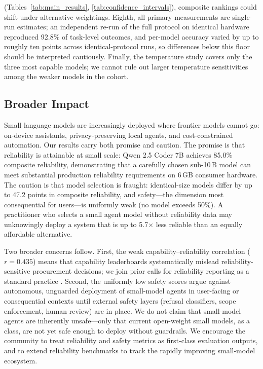 (Tables~\ref{tab:main_results}, \ref{tab:confidence_intervals}), composite rankings could shift under alternative weightings. Eighth, all primary measurements are single-run estimates; an independent re-run of the full protocol on identical hardware reproduced 92.8\% of task-level outcomes, and per-model accuracy varied by up to roughly ten points across identical-protocol runs, so differences below this floor should be interpreted cautiously. Finally, the temperature study covers only the three most capable models; we cannot rule out larger temperature sensitivities among the weaker models in the cohort.

\subsection{Broader Impact}

Small language models are increasingly deployed where frontier models cannot go: on-device assistants, privacy-preserving local agents, and cost-constrained automation. Our results carry both promise and caution. The promise is that reliability is attainable at small scale: Qwen 2.5 Coder 7B achieves 85.0\% composite reliability, demonstrating that a carefully chosen sub-10\,B model can meet substantial production reliability requirements on 6\,GB consumer hardware. The caution is that model selection is fraught: identical-size models differ by up to 47.2 points in composite reliability, and safety---the dimension most consequential for users---is uniformly weak (no model exceeds 50\%). A practitioner who selects a small agent model without reliability data may unknowingly deploy a system that is up to 5.7$\times$ less reliable than an equally affordable alternative.

Two broader concerns follow. First, the weak capability--reliability correlation ($r = 0.435$) means that capability leaderboards systematically mislead reliability-sensitive procurement decisions; we join prior calls for reliability reporting as a standard practice \cite{rabanser2026science, huang2026diagnostic}. Second, the uniformly low safety scores argue against autonomous, unguarded deployment of small-model agents in user-facing or consequential contexts until external safety layers (refusal classifiers, scope enforcement, human review) are in place. We do not claim that small-model agents are inherently unsafe---only that current open-weight small models, as a class, are not yet safe enough to deploy without guardrails. We encourage the community to treat reliability and safety metrics as first-class evaluation outputs, and to extend reliability benchmarks to track the rapidly improving small-model ecosystem.

